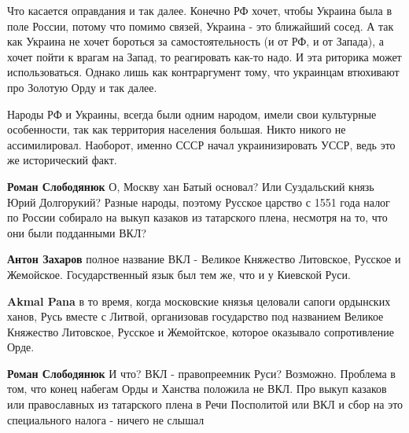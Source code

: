 \begin{itemize}
\begin{itemize}
Что касается оправдания и так далее. Конечно РФ хочет, чтобы Украина была в
поле России, потому что помимо связей, Украина - это ближайший сосед. А так как
Украина не хочет бороться за самостоятельность (и от РФ, и от Запада), а хочет
пойти к врагам на Запад, то реагировать как-то надо. И эта риторика может
использоваться. Однако лишь как контраргумент тому, что украинцам втюхивают про
Золотую Орду и так далее.

Народы РФ и Украины, всегда были одним народом, имели свои культурные
особенности, так как территория населения большая. Никто никого не
ассимилировал. Наоборот, именно СССР начал украинизировать УССР, ведь это же
исторический факт.

 
\textbf{Роман Слободянюк} О, Москву хан Батый основал? Или Суздальский князь Юрий Долгорукий? Разные народы, поэтому Русское царство с 1551 года налог по России собирало на выкуп казаков из татарского плена, несмотря на то, что они были подданными ВКЛ?

 
\textbf{Антон Захаров} полное название ВКЛ - Великое Княжество Литовское, Русское и Жемойское. Государственный язык был тем же, что и у Киевской Руси.

 
\textbf{Akmal Pana} в то время, когда московские князья целовали сапоги ордынских ханов, Русь вместе с Литвой, организовав государство под названием Великое Княжество Литовское, Русское и Жемойтское, которое оказывало сопротивление Орде.

 
\textbf{Роман Слободянюк} И что? ВКЛ - правопреемник Руси? Возможно. Проблема в том, что конец набегам Орды и Ханства положила не ВКЛ. Про выкуп казаков или православных из татарского плена в Речи Посполитой или ВКЛ и сбор на это специального налога - ничего не слышал


\end{itemize}
\end{itemize}

